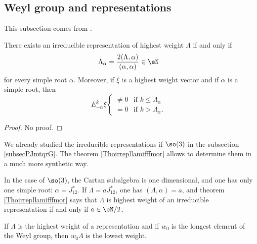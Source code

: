 \subsection{Weyl group and representations}

This subsection comes from \cite{Cornwell}.

\begin{theorem}     \label{Thoirrepllamifffmor}
    There exists an irreducible representation of highest weight $\Lambda$ if and only if
    \begin{equation}
        \Lambda_{\alpha}=\frac{ 2(\Lambda,\alpha) }{ (\alpha,\alpha) }\in\eN
    \end{equation}
    for every simple root $\alpha$. Moreover, if $\xi$ is a highest weight vector and if $\alpha$ is a simple root, then
    \begin{equation}
        E_{-\alpha}^k\xi    
                \begin{cases}
                    \neq 0  &\text{if $k\leq\Lambda_{\alpha}$}\\
                    =0  &\text{if $k>\Lambda_{\alpha}$}.    
                \end{cases}
    \end{equation}
\end{theorem}

\begin{proof}
    No proof.
\end{proof}

\begin{example} \label{ExHESKimc}
    We already studied the irreducible representations if \( \so(3)\) in the subsection \ref{subsecPJmtqrG}. The theorem \ref{Thoirrepllamifffmor} allows to determine them in a much more synthetic way.

    In the case of $\so(3)$, the Cartan subalgebra is one dimensional, and one has only one simple root: $\alpha=J_{12}^*$. If $\Lambda=aJ_{12}^*$, one has $(\Lambda,\alpha)=a$, and theorem \ref{Thoirrepllamifffmor} says that $\Lambda$ is highest weight of an irreducible representation if and only if $a\in \eN/2$.
\end{example}

\begin{theorem}     \label{ThoLOngestlowestrepres}
    If \( \Lambda\) is the highest weight of a representation and if \( w_0\) is the longest element of the Weyl group, then \( w_0\Lambda\) is the lowest weight.
\end{theorem}

